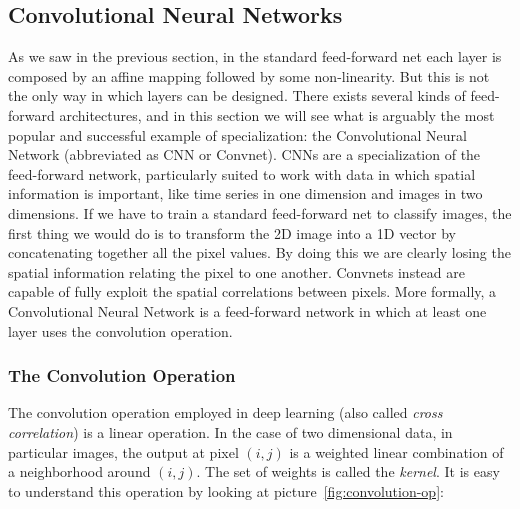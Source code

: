 \documentclass[../main.tex]{subfiles}
\begin{document}
    \subsection{Convolutional Neural Networks}\label{subsec:convnets}
    As we saw in the previous section, in the standard feed-forward net each layer is composed by an affine mapping followed by some non-linearity.
    But this is not the only way in which layers can be designed. There exists several kinds of feed-forward architectures, and in this section
    we will see what is arguably the most popular and successful example of specialization: the Convolutional
    Neural Network (abbreviated as CNN or Convnet).
    \newline
    CNNs are a specialization of the feed-forward network, particularly suited to work with data in which spatial information is important, like
    time series in one dimension and images in two dimensions. If we have to train a standard feed-forward net to classify images, the first
    thing we would do is to transform the 2D image into a 1D vector by concatenating together all the pixel values. By doing this we are
    clearly losing the spatial information relating the pixel to one another. Convnets instead are capable of fully exploit the spatial
    correlations between pixels.
    \newline
    More formally, a Convolutional Neural Network is a feed-forward network in which at least one layer uses the convolution operation.

    \subsubsection{The Convolution Operation}
    The convolution operation employed in deep learning (also called \textit{cross correlation}) is a linear operation.
    In the case of two dimensional data, in particular images, the output at pixel $(i, j)$ is a weighted linear combination
    of a neighborhood around $(i, j)$. The set of weights is called the \textit{kernel}. It is easy to understand this operation
    by looking at picture~\ref{fig:convolution-op}:
\end{document}
